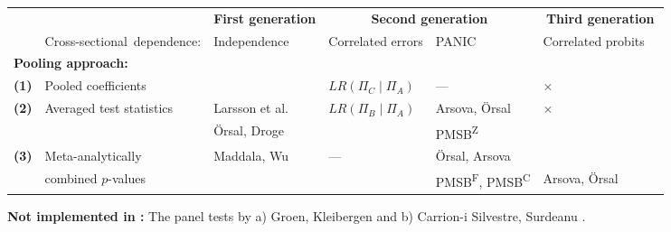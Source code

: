 
\begin{threeparttable}
	\begin{tabular}{ll|l|ll|ll}
		\hline\hline
		&  & \multicolumn{1}{|c|}{ \textbf{First generation} } & \multicolumn{2}{|c}{ \textbf{Second generation} } & \multicolumn{2}{|c}{ \textbf{Third generation} }  \\
		& \hfill \mbox{Cross-sectional dependence:} & Independence & Correlated errors & PANIC \citeyearpar{BaiNg2004} & Correlated probits & \\ 
		\multicolumn{2}{l|}{ \textbf{Pooling approach:} } &  &  &  &  & \\ 
		\hline
		\textbf{(1)} & Pooled coefficients & \citet{Breitung2005} & \tnote{a)}\quad $ LR(\Pi_C \mid \Pi_A) $ & --- & $ \times $ & \\[7pt]
		\textbf{(2)} & Averaged test statistics & Larsson et al.~\citeyearpar{LarssonEtAl2001} &  \tnote{a)}\quad $ LR(\Pi_B \mid \Pi_A) $  & Arsova, Örsal \citeyearpar{ArsovaOersal2018} & $ \times $  & \\
		&  & Örsal, Droge \citeyearpar{OersalDroge2014} &  & \tnote{b)}\quad PMSB\textsuperscript{Z} &  & \\[7pt]
		\textbf{(3)} & Meta-analytically & Maddala, Wu \citeyearpar{MaddalaWu1999} & \quad --- & Örsal, Arsova \citeyearpar{ArsovaOersal2017} & \citet{Hartung1999} &  \\
		&  combined $p$-values & \citet{Choi2001} &   & \tnote{b)}\quad PMSB\textsuperscript{F}, PMSB\textsuperscript{C}  & Arsova, Örsal \citeyearpar{ArsovaOersal2020} &  \\ 
		\hline\hline
	\end{tabular}
	\begin{tablenotes}
		\item \normalsize{\textbf{Not implemented in :} The panel tests by a) Groen, Kleibergen \citeyearpar{GroenFrank2003} and b) Carrion-i Silvestre, Surdeanu \citeyearpar{SilvestreSurdeanu2011}.}
	\end{tablenotes}
\end{threeparttable}